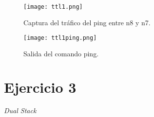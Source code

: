 \documentclass[osajnl,twocolumn,showpacs,superscriptaddress,10pt]{revtex4-1} %
\begin{document}
\begin{enumerate}[a)]
    \begin{figure}[H]
        \centering
        \texttt{[image: ttl1.png]}
        \caption{Captura del tráfico del ping entre n8 y n7.}
        \label{image:ttl1}
    \end{figure}

    \begin{figure}[H]
        \centering
        \texttt{[image: ttl1ping.png]}
        \caption{Salida del comando ping.}
        \label{image:ttl1ping}
    \end{figure}
\end{enumerate}

\section{Ejercicio 3}

\textit{Dual Stack}
\end{document}
